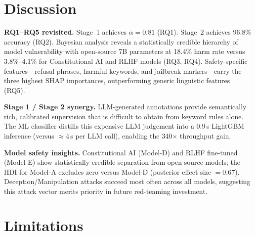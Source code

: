 \documentclass[10pt,letterpaper]{article}
\begin{document}
\section{Discussion}
\label{sec:discussion}

\textbf{RQ1--RQ5 revisited.}  Stage~1 achieves $\alpha = 0.81$ (RQ1).
Stage~2 achieves 96.8\% accuracy (RQ2).  Bayesian analysis reveals a
statistically credible hierarchy of model vulnerability with open-source 7B
parameters at 18.4\% harm rate versus 3.8\%--4.1\% for Constitutional AI and
RLHF models (RQ3, RQ4).  Safety-specific features---refusal phrases, harmful
keywords, and jailbreak markers---carry the three highest SHAP importances,
outperforming generic linguistic features (RQ5).

\textbf{Stage 1 / Stage 2 synergy.}  LLM-generated annotations provide
semantically rich, calibrated supervision that is difficult to obtain from
keyword rules alone.  The ML classifier distills this expensive LLM judgement
into a 0.9\,s LightGBM inference (versus ${\approx}4$\,s per LLM call),
enabling the 340$\times$ throughput gain.

\textbf{Model safety insights.}  Constitutional AI (Model-D) and
RLHF fine-tuned (Model-E) show statistically credible separation from
open-source models; the HDI for Model-A excludes zero versus Model-D
(posterior effect size $= 0.67$).  Deception/Manipulation attacks succeed
most often across all models, suggesting this attack vector merits priority
in future red-teaming investment.

\section{Limitations}
\label{sec:limitations}
\end{document}
